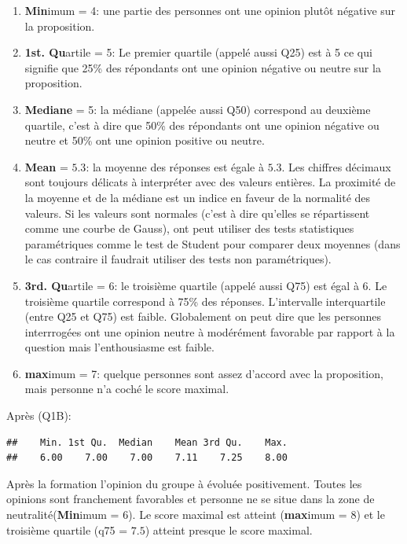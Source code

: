\documentclass[12pt,english,french]{article}\usepackage{graphicx, color}
\makeatletter
\newenvironment{kframe}{%
 \def\at@end@of@kframe{}%
 \ifinner\ifhmode%
  \def\at@end@of@kframe{\end{minipage}}%
  \begin{minipage}{\columnwidth}%
 \fi\fi%
 \def\FrameCommand##1{\hskip\@totalleftmargin \hskip-\fboxsep
 \colorbox{shadecolor}{##1}\hskip-\fboxsep
     \hskip-\linewidth \hskip-\@totalleftmargin \hskip\columnwidth}%
 \MakeFramed {\advance\hsize-\width
   \@totalleftmargin\z@ \linewidth\hsize
   \@setminipage}}%
 {\par\unskip\endMakeFramed%
 \at@end@of@kframe}
\newenvironment{knitrout}{}{} %
\makeatother
\begin{document}
\begin{enumerate}
  \item \textbf{Min}imum = 4: une partie des personnes ont une opinion plutôt négative sur la proposition.
  \item \textbf{1st. Qu}artile = 5: Le premier quartile (appelé aussi Q25) est à 5 ce qui signifie que 25\% des répondants ont une opinion négative ou neutre sur la proposition.
  \item \textbf{Mediane} = 5: la médiane (appelée aussi Q50) correspond au deuxième quartile, c'est à dire que 50\% des répondants ont une opinion négative ou neutre et 50\% ont une opinion positive ou neutre.
  \item \textbf{Mean} = $5.3$: la moyenne des réponses est égale à $5.3$. Les chiffres décimaux sont toujours délicats à interpréter avec des valeurs entières. La proximité de la moyenne et de la médiane est un indice en faveur de la normalité des valeurs. Si les valeurs sont normales (c'est à dire qu'elles se répartissent comme une courbe de Gauss), ont peut utiliser des tests statistiques paramétriques comme le test de Student pour comparer deux moyennes (dans le cas contraire il faudrait utiliser des tests non paramétriques).
  \item \textbf{3rd. Qu}artile = 6: le troisième quartile (appelé aussi Q75) est égal à 6. Le troisième quartile correspond à 75\% des réponses. L'intervalle interquartile (entre Q25 et Q75) est faible. Globalement on peut dire que les personnes interrrogées ont une opinion neutre à modérément favorable par rapport à la question mais l'enthousiasme est faible.
  \item \textbf{max}imum = 7: quelque personnes sont assez d'accord avec la proposition, mais personne n'a coché le score maximal.
\end{enumerate}

Après (Q1B):
\begin{knitrout}
\color{fgcolor}\begin{kframe}
\begin{verbatim}
##    Min. 1st Qu.  Median    Mean 3rd Qu.    Max. 
##    6.00    7.00    7.00    7.11    7.25    8.00
\end{verbatim}
\end{kframe}
\end{knitrout}

Après la formation l'opinion du groupe à évoluée positivement. Toutes les opinions sont franchement favorables et personne ne se situe dans la zone de neutralité(\textbf{Min}imum = 6). Le score maximal est atteint (\textbf{max}imum = 8) et le troisième quartile (q75 = $7.5$) atteint presque le score maximal.
\end{document}
